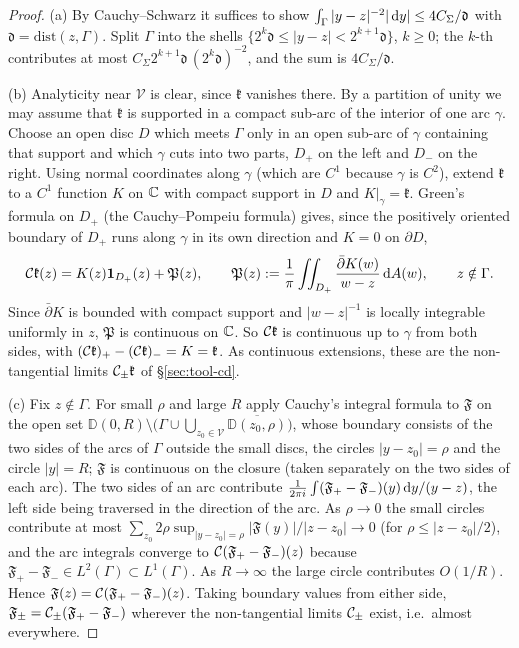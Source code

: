 \begin{proof}
(a) By Cauchy--Schwarz it suffices to show $\int_\Gamma|y-z|^{-2}|\,\mathrm{d} y|\le4C_\Sigma/\mathfrak d$ with $\mathfrak d=
\mathrm{dist}(z,\Gamma)$. Split $\Gamma$ into the shells $\{2^k\mathfrak d\le|y-z|<2^{k+1}\mathfrak d\}$, $k\ge0$; the
$k$-th contributes at most $C_\Sigma2^{k+1}\mathfrak d\,(2^k\mathfrak d)^{-2}$, and the sum is $4C_\Sigma/\mathfrak d$.

(b) Analyticity near $\mathcal V$ is clear, since $\mathfrak k$ vanishes there. By a partition of unity we may assume
that $\mathfrak k$ is supported in a compact sub-arc of the interior of one arc $\gamma$. Choose an open disc $D$ which
meets $\Gamma$ only in an open sub-arc of $\gamma$ containing that support and which $\gamma$ cuts into two parts, $D_+$
on the left and $D_-$ on the right. Using normal coordinates along $\gamma$ (which are $C^1$ because $\gamma$ is $C^2$),
extend $\mathfrak k$ to a $C^1$ function $K$ on $\mathbb{C}$ with compact support in $D$ and $K|_\gamma=\mathfrak k$. Green's
formula on $D_+$ (the Cauchy--Pompeiu formula) gives, since the positively oriented boundary of $D_+$ runs along
$\gamma$ in its own direction and $K=0$ on $\partial D$,
\[
  \mathcal{C}\mathfrak k(z)=K(z)\mathbf 1_{D_+}(z)+\mathfrak P(z),\qquad
  \mathfrak P(z):=\frac1\pi\iint_{D_+}\frac{\bar\partial K(w)}{w-z}\,\mathrm{d} A(w),\qquad z\notin\Gamma .
\]
Since $\bar\partial K$ is bounded with compact support and $|w-z|^{-1}$ is locally integrable uniformly in $z$, $\mathfrak P$
is continuous on $\mathbb{C}$. So $\mathcal{C}\mathfrak k$ is continuous up to $\gamma$ from both sides, with
$(\mathcal{C}\mathfrak k)_+-(\mathcal{C}\mathfrak k)_-=K=\mathfrak k$. As continuous extensions, these are the non-tangential
limits $\mathcal{C}_\pm\mathfrak k$ of \S\ref{sec:tool-cd}.

(c) Fix $z\notin\Gamma$. For small $\rho$ and large $R$ apply Cauchy's integral formula to $\mathfrak F$ on the open set
$\mathbb D(0,R)\setminus\bigl(\Gamma\cup\bigcup_{z_0\in\mathcal V}\overline{\mathbb D(z_0,\rho)}\bigr)$, whose boundary consists of the two sides
of the arcs of $\Gamma$ outside the small discs, the circles $|y-z_0|=\rho$ and the circle $|y|=R$; $\mathfrak F$ is continuous on
the closure (taken separately on the two sides of each arc). The two sides of an arc contribute
$\frac1{2\pi i}\int(\mathfrak F_+-\mathfrak F_-)(y)\,\mathrm{d} y/(y-z)$, the left side being traversed in the direction of the arc. As $\rho\to0$
the small circles contribute at most $\sum_{z_0}2\rho\sup_{|y-z_0|=\rho}|\mathfrak F(y)|/|z-z_0|\to0$ (for $\rho\le|z-z_0|/2$), and the
arc integrals converge to $\mathcal{C}(\mathfrak F_+-\mathfrak F_-)(z)$ because $\mathfrak F_+-\mathfrak F_-\in L^2(\Gamma)\subset L^1(\Gamma)$. As $R\to\infty$ the large
circle contributes $O(1/R)$. Hence $\mathfrak F(z)=\mathcal{C}(\mathfrak F_+-\mathfrak F_-)(z)$. Taking boundary values from either side,
$\mathfrak F_\pm=\mathcal{C}_\pm(\mathfrak F_+-\mathfrak F_-)$ wherever the non-tangential limits $\mathcal{C}_\pm$ exist, i.e.\ almost everywhere.
\end{proof}


